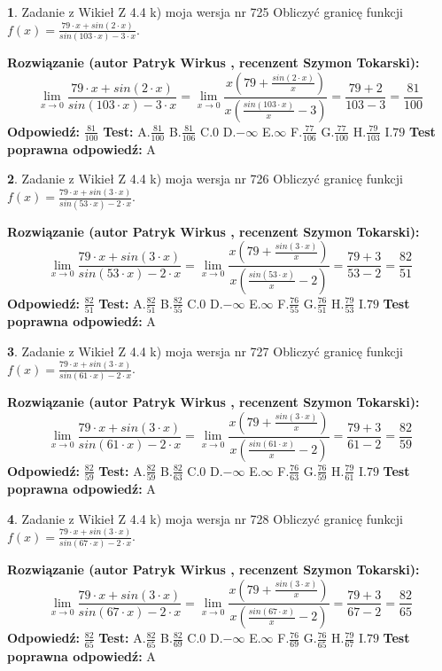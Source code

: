 \documentclass[12pt, a4paper]{article}
\theoremstyle{definition} %
\newtheorem{zad}{}
\newcommand{\zadStart}[1]{\begin{zad}#1\newline}
\newcommand{\zadStop}{\end{zad}}
\newcommand{\rozwStart}[2]{\noindent \textbf{Rozwiązanie (autor #1 , recenzent #2): }\newline}
\newcommand{\rozwStop}{\newline}
\newcommand{\odpStart}{\noindent \textbf{Odpowiedź:}\newline}
\newcommand{\odpStop}{\newline}
\newcommand{\testStart}{\noindent \textbf{Test:}\newline}
\newcommand{\testStop}{\newline}
\newcommand{\kluczStart}{\noindent \textbf{Test poprawna odpowiedź:}\newline}
\newcommand{\kluczStop}{\newline}
\begin{document}
\zadStart{Zadanie z Wikieł Z 4.4 k) moja wersja nr 725}
Obliczyć granicę funkcji $f(x)=\frac{79\cdot x +sin(2\cdot x)}{sin(103\cdot x) -3\cdot x}$.
\zadStop
\rozwStart{Patryk Wirkus}{Szymon Tokarski}
$$\lim\limits_{x\to 0}\frac{79\cdot x +sin(2\cdot x)}{sin(103\cdot x) -3\cdot x}
=\lim\limits_{x\to 0}\frac{x(79+\frac{sin(2\cdot x)}{x})}{x(\frac{sin(103\cdot x)}{x}-3)}
=\frac{79+2}{103-3} = \frac{81}{100}$$
\rozwStop
\odpStart
$\frac{81}{100}$
\odpStop
\testStart
A.$\frac{81}{100}$
B.$\frac{81}{106}$
C.$0$
D.$-\infty$
E.$\infty$
F.$\frac{77}{106}$
G.$\frac{77}{100}$
H.$\frac{79}{103}$
I.$79$
\testStop
\kluczStart
A
\kluczStop



\zadStart{Zadanie z Wikieł Z 4.4 k) moja wersja nr 726}
Obliczyć granicę funkcji $f(x)=\frac{79\cdot x +sin(3\cdot x)}{sin(53\cdot x) -2\cdot x}$.
\zadStop
\rozwStart{Patryk Wirkus}{Szymon Tokarski}
$$\lim\limits_{x\to 0}\frac{79\cdot x +sin(3\cdot x)}{sin(53\cdot x) -2\cdot x}
=\lim\limits_{x\to 0}\frac{x(79+\frac{sin(3\cdot x)}{x})}{x(\frac{sin(53\cdot x)}{x}-2)}
=\frac{79+3}{53-2} = \frac{82}{51}$$
\rozwStop
\odpStart
$\frac{82}{51}$
\odpStop
\testStart
A.$\frac{82}{51}$
B.$\frac{82}{55}$
C.$0$
D.$-\infty$
E.$\infty$
F.$\frac{76}{55}$
G.$\frac{76}{51}$
H.$\frac{79}{53}$
I.$79$
\testStop
\kluczStart
A
\kluczStop



\zadStart{Zadanie z Wikieł Z 4.4 k) moja wersja nr 727}
Obliczyć granicę funkcji $f(x)=\frac{79\cdot x +sin(3\cdot x)}{sin(61\cdot x) -2\cdot x}$.
\zadStop
\rozwStart{Patryk Wirkus}{Szymon Tokarski}
$$\lim\limits_{x\to 0}\frac{79\cdot x +sin(3\cdot x)}{sin(61\cdot x) -2\cdot x}
=\lim\limits_{x\to 0}\frac{x(79+\frac{sin(3\cdot x)}{x})}{x(\frac{sin(61\cdot x)}{x}-2)}
=\frac{79+3}{61-2} = \frac{82}{59}$$
\rozwStop
\odpStart
$\frac{82}{59}$
\odpStop
\testStart
A.$\frac{82}{59}$
B.$\frac{82}{63}$
C.$0$
D.$-\infty$
E.$\infty$
F.$\frac{76}{63}$
G.$\frac{76}{59}$
H.$\frac{79}{61}$
I.$79$
\testStop
\kluczStart
A
\kluczStop



\zadStart{Zadanie z Wikieł Z 4.4 k) moja wersja nr 728}
Obliczyć granicę funkcji $f(x)=\frac{79\cdot x +sin(3\cdot x)}{sin(67\cdot x) -2\cdot x}$.
\zadStop
\rozwStart{Patryk Wirkus}{Szymon Tokarski}
$$\lim\limits_{x\to 0}\frac{79\cdot x +sin(3\cdot x)}{sin(67\cdot x) -2\cdot x}
=\lim\limits_{x\to 0}\frac{x(79+\frac{sin(3\cdot x)}{x})}{x(\frac{sin(67\cdot x)}{x}-2)}
=\frac{79+3}{67-2} = \frac{82}{65}$$
\rozwStop
\odpStart
$\frac{82}{65}$
\odpStop
\testStart
A.$\frac{82}{65}$
B.$\frac{82}{69}$
C.$0$
D.$-\infty$
E.$\infty$
F.$\frac{76}{69}$
G.$\frac{76}{65}$
H.$\frac{79}{67}$
I.$79$
\testStop
\kluczStart
A
\kluczStop
\end{document}
